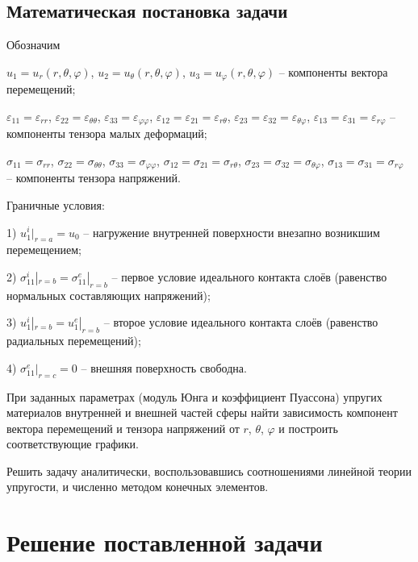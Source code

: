 \documentclass[a4paper,12pt]{article}	%
\begin{document}
\subsection{Математическая постановка задачи}

Обозначим

$u_1=u_r(r,\theta,\varphi)$, $u_2=u_{\theta}(r,\theta,\varphi)$, $u_3=u_{\varphi}(r,\theta,\varphi)$ -- компоненты вектора перемещений;

$\varepsilon_{11}=\varepsilon_{rr}$, $\varepsilon_{22}=\varepsilon_{\theta\theta}$, $\varepsilon_{33}=\varepsilon_{\varphi\varphi}$,
$\varepsilon_{12}=\varepsilon_{21}=\varepsilon_{r\theta}$,
$\varepsilon_{23}=\varepsilon_{32}=\varepsilon_{\theta\varphi}$,
$\varepsilon_{13}=\varepsilon_{31}=\varepsilon_{r\varphi}$ -- компоненты тензора малых деформаций;

$\sigma_{11}=\sigma_{rr}$, $\sigma_{22}=\sigma_{\theta\theta}$, $\sigma_{33}=\sigma_{\varphi\varphi}$,
$\sigma_{12}=\sigma_{21}=\sigma_{r\theta}$,
$\sigma_{23}=\sigma_{32}=\sigma_{\theta\varphi}$,
$\sigma_{13}=\sigma_{31}=\sigma_{r\varphi}$ -- компоненты тензора напряжений.
\newline

Граничные условия:

1) $u_1^{i}|_{r=a}=u_0$ -- нагружение внутренней поверхности внезапно возникшим перемещением;

2) $\sigma_{11}^{i}|_{r=b}=\sigma_{11}^{e}|_{r=b}$ -- первое условие идеального контакта слоёв (равенство нормальных составляющих напряжений);

3) $u_1^{i}|_{r=b}=u_1^{e}|_{r=b}$ -- второе условие идеального контакта слоёв (равенство радиальных перемещений);

4) $\sigma_{11}^{e}|_{r=c}=0$ -- внешняя поверхность свободна.
\newline

При заданных параметрах (модуль Юнга и коэффициент Пуассона) упругих материалов внутренней и внешней частей сферы найти зависимость компонент вектора перемещений и тензора напряжений от $r$, $\theta$, $\varphi$ и построить соответствующие графики.
\newline

Решить задачу аналитически, воспользовавшись соотношениями линейной теории упругости, и численно методом конечных элементов.

\newpage

\Large
\section{Решение поставленной задачи}
\end{document}

